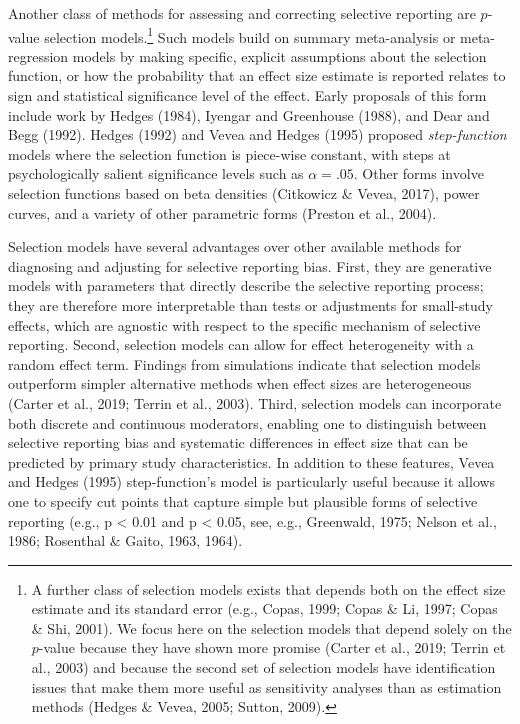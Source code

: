 \documentclass[
  man, donotrepeattitle,floatsintext]{apa7}
\begin{document}
Another class of methods for assessing and correcting selective reporting are \(p\)-value selection models.\footnote{A further class of selection models exists that depends both on the effect size estimate and its standard error (e.g., Copas, 1999; Copas \& Li, 1997; Copas \& Shi, 2001). We focus here on the selection models that depend solely on the \(p\)-value because they have shown more promise (Carter et al., 2019; Terrin et al., 2003) and because the second set of selection models have identification issues that make them more useful as sensitivity analyses than as estimation methods (Hedges \& Vevea, 2005; Sutton, 2009).}
Such models build on summary meta-analysis or meta-regression models by making specific, explicit assumptions about the selection function, or how the probability that an effect size estimate is reported relates to sign and statistical significance level of the effect. Early proposals of this form include work by Hedges (1984), Iyengar and Greenhouse (1988), and Dear and Begg (1992). Hedges (1992) and Vevea and Hedges (1995) proposed \emph{step-function} models where the selection function is piece-wise constant, with steps at psychologically salient significance levels such as \(\alpha = .05\).
Other forms involve selection functions based on beta densities (Citkowicz \& Vevea, 2017), power curves, and a variety of other parametric forms (Preston et al., 2004).

Selection models have several advantages over other available methods for diagnosing and adjusting for selective reporting bias.
First, they are generative models with parameters that directly describe the selective reporting process; they are therefore more interpretable than tests or adjustments for small-study effects, which are agnostic with respect to the specific mechanism of selective reporting.
Second, selection models can allow for effect heterogeneity with a random effect term.
Findings from simulations indicate that selection models outperform simpler alternative methods when effect sizes are heterogeneous (Carter et al., 2019; Terrin et al., 2003).
Third, selection models can incorporate both discrete and continuous moderators, enabling one to distinguish between selective reporting bias and systematic differences in effect size that can be predicted by primary study characteristics.
In addition to these features, Vevea and Hedges (1995) step-function's model is particularly useful because it allows one to specify cut points that capture simple but plausible forms of selective reporting (e.g., p \textless{} 0.01 and p \textless{} 0.05, see, e.g., Greenwald, 1975; Nelson et al., 1986; Rosenthal \& Gaito, 1963, 1964).
\end{document}
